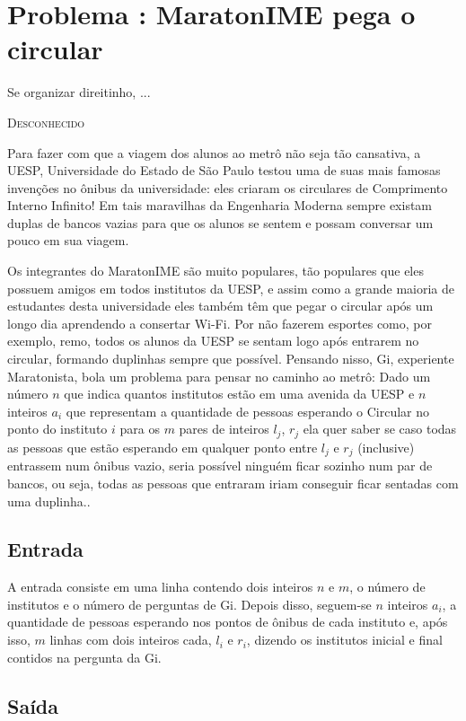 \section*{Problema \proxLetra: MaratonIME pega o circular}

\epigraph{Se organizar direitinho, ...}{\textsc{Desconhecido}}

Para fazer com que a viagem dos alunos ao metrô não seja tão cansativa, a UESP, Universidade do Estado de São Paulo testou uma de suas mais famosas invenções no ônibus da universidade: eles criaram os circulares de Comprimento Interno Infinito! Em tais maravilhas da Engenharia Moderna sempre existam duplas de bancos vazias para que os alunos se sentem e possam conversar um pouco em sua viagem.
 
Os integrantes do MaratonIME são muito populares, tão populares que eles possuem amigos em todos institutos da UESP, e assim como a grande maioria de estudantes desta universidade eles também têm que pegar o circular após um longo dia aprendendo a consertar Wi-Fi. Por não fazerem esportes como, por exemplo, remo, todos os alunos da UESP se sentam logo após entrarem no circular, formando duplinhas sempre que possível. Pensando nisso, Gi, experiente Maratonista, bola um problema para pensar no caminho ao metrô: Dado um número $n$ que indica quantos institutos estão em uma avenida da UESP e $n$ inteiros $a_i$ que representam a quantidade de pessoas esperando o Circular no ponto do instituto $i$ para os $m$ pares de inteiros $l_j$, $r_j$ ela quer saber se caso todas as pessoas que estão esperando em qualquer ponto entre $l_j$ e $r_j$ (inclusive) entrassem num ônibus vazio, seria possível ninguém ficar sozinho num par de bancos, ou seja, todas as pessoas que entraram iriam conseguir ficar sentadas com uma duplinha..

\subsection*{Entrada}

A entrada consiste em uma linha contendo dois inteiros $n$ e $m$, o número de institutos e o número de perguntas de Gi. Depois disso, seguem-se $n$ inteiros $a_i$, a quantidade de pessoas esperando nos pontos de ônibus de cada instituto e, após isso, $m$ linhas com dois inteiros cada, $l_i$ e $r_i$, dizendo os institutos inicial e final contidos na pergunta da Gi.


\subsection*{Saída}

